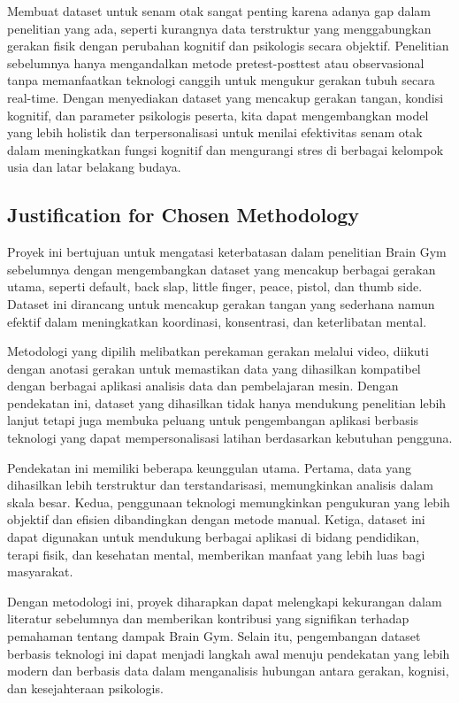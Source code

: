 \documentclass[12pt,a4paper]{article}
\begin{document}
Membuat dataset untuk senam otak sangat penting karena adanya gap dalam penelitian yang ada, seperti kurangnya data terstruktur yang menggabungkan gerakan fisik dengan perubahan kognitif dan psikologis secara objektif. Penelitian sebelumnya hanya mengandalkan metode pretest-posttest atau observasional tanpa memanfaatkan teknologi canggih untuk mengukur gerakan tubuh secara real-time. Dengan menyediakan dataset yang mencakup gerakan tangan, kondisi kognitif, dan parameter psikologis peserta, kita dapat mengembangkan model yang lebih holistik dan terpersonalisasi untuk menilai efektivitas senam otak dalam meningkatkan fungsi kognitif dan mengurangi stres di berbagai kelompok usia dan latar belakang budaya.

\subsection{Justification for Chosen Methodology}
Proyek ini bertujuan untuk mengatasi keterbatasan dalam penelitian Brain Gym sebelumnya dengan mengembangkan dataset yang mencakup berbagai gerakan utama, seperti default, back slap, little finger, peace, pistol, dan thumb side. Dataset ini dirancang untuk mencakup gerakan tangan yang sederhana namun efektif dalam meningkatkan koordinasi, konsentrasi, dan keterlibatan mental.

Metodologi yang dipilih melibatkan perekaman gerakan melalui video, diikuti dengan anotasi gerakan untuk memastikan data yang dihasilkan kompatibel dengan berbagai aplikasi analisis data dan pembelajaran mesin. Dengan pendekatan ini, dataset yang dihasilkan tidak hanya mendukung penelitian lebih lanjut tetapi juga membuka peluang untuk pengembangan aplikasi berbasis teknologi yang dapat mempersonalisasi latihan berdasarkan kebutuhan pengguna.

Pendekatan ini memiliki beberapa keunggulan utama. Pertama, data yang dihasilkan lebih terstruktur dan terstandarisasi, memungkinkan analisis dalam skala besar. Kedua, penggunaan teknologi memungkinkan pengukuran yang lebih objektif dan efisien dibandingkan dengan metode manual. Ketiga, dataset ini dapat digunakan untuk mendukung berbagai aplikasi di bidang pendidikan, terapi fisik, dan kesehatan mental, memberikan manfaat yang lebih luas bagi masyarakat.

Dengan metodologi ini, proyek diharapkan dapat melengkapi kekurangan dalam literatur sebelumnya dan memberikan kontribusi yang signifikan terhadap pemahaman tentang dampak Brain Gym. Selain itu, pengembangan dataset berbasis teknologi ini dapat menjadi langkah awal menuju pendekatan yang lebih modern dan berbasis data dalam menganalisis hubungan antara gerakan, kognisi, dan kesejahteraan psikologis.
\end{document}
